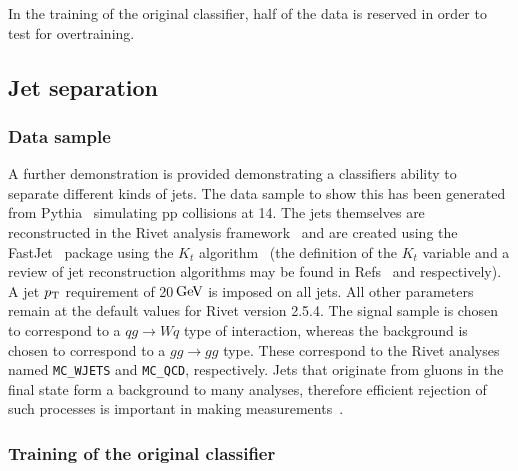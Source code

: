 \documentclass[final,5p,times,twocolumn]{elsarticle}
\def\to                 {\ensuremath{\rightarrow}\xspace}
\newcommand{\tev}{\ifthenelse{\boolean{inbibliography}}{\ensuremath{~T\kern -0.05em eV}\xspace}{\ensuremath{\mathrm{\,Te\kern -0.1em V}}}\xspace}
\newcommand{\gev}{\ensuremath{\mathrm{\,Ge\kern -0.1em V}}\xspace}
\def\pt         {\mbox{$p_{\rm T}$}\xspace}
\begin{document}
In the training of the original classifier, half of the data is
reserved in order to test for overtraining.


\subsection{Jet separation}
\label{sec:hepGPD}

\subsubsection{Data sample}

A further demonstration is provided demonstrating a classifiers ability to separate different
kinds of jets. The data sample to show this has been generated from Pythia~\cite{Sjostrand:2007gs}
simulating pp collisions at 14\tev.
The jets themselves are reconstructed in the Rivet analysis framework~\cite{Buckley:2010ar}
and are created using the FastJet~\cite{Cacciari:2011ma} package using the $K_t$ algorithm~\cite{Salam:2007xv}
(the definition
of the $K_t$ variable and a review of jet reconstruction algorithms
may be found in Refs~\cite{kt} and \cite{Atkin:2015msa} respectively).
A jet \pt requirement of 20\gev is imposed on all jets.
All other parameters remain at the default values for Rivet version 2.5.4.
The signal sample is chosen to correspond to a $qg\to Wq$ type of interaction,
whereas the background is chosen to correspond to a $gg \to gg$ type. These correspond
to the Rivet analyses named {\tt MC\_WJETS} and {\tt MC\_QCD}, respectively.
Jets that originate from gluons in the final state form a background to many
analyses, therefore efficient rejection of such processes is important in making
measurements~\cite{Komiske:2016rsd}.

\subsubsection{Training of the original classifier}
\end{document}
